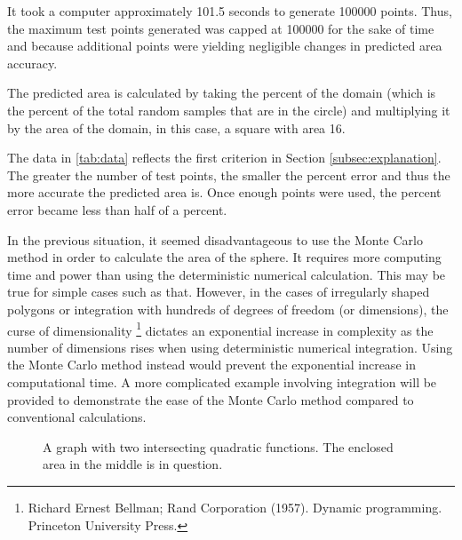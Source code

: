 \documentclass[10pt, letterpaper]{article}
\begin{document}
  It took a computer approximately 101.5 seconds to generate 100000 points. Thus, the maximum test points generated was
  capped at 100000 for the sake of time and because additional points were yielding negligible changes in predicted area accuracy.

  The predicted area is calculated by taking the percent of the domain (which is the percent of the total random samples that are in the circle)
  and multiplying it by the area of the domain, in this case, a square with area 16.

  The data in \ref{tab:data} reflects the first criterion in Section \ref{subsec:explanation}. The greater the number of test points,
  the smaller the percent error and thus the more accurate the predicted area is. Once enough points were used, the percent error became
  less than half of a percent.

  In the previous situation, it seemed disadvantageous to use the Monte Carlo method in order to calculate the area of the sphere. It requires
  more computing time and power than using the deterministic numerical calculation. This may be true for simple cases such as that. However,
  in the cases of irregularly shaped polygons or integration with hundreds of degrees of freedom (or dimensions), the curse of dimensionality
  \footnote{Richard Ernest Bellman; Rand Corporation (1957). Dynamic programming. Princeton University Press.} dictates an exponential increase
  in complexity as the number of dimensions rises when using deterministic numerical integration. Using the Monte Carlo method instead would
  prevent the exponential increase in computational time. A more complicated example involving integration will be provided to demonstrate the
  ease of the Monte Carlo method compared to conventional calculations.

  \begin{figure}
    \centering
    \caption{A graph with two intersecting quadratic functions. The enclosed area in the middle is in question.} \label{fig:quadratic}
  \end{figure}
\end{document}

